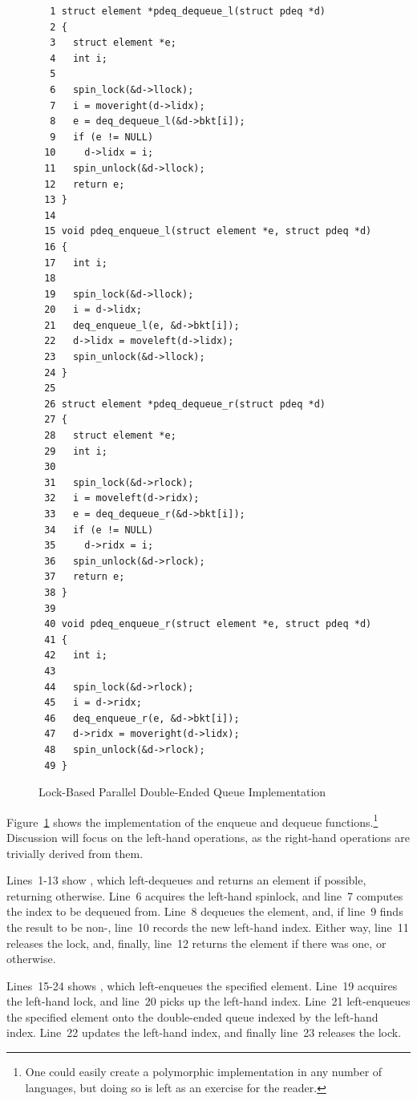 \begin{figure}[bp]
{ \scriptsize
\begin{verbatim}
  1 struct element *pdeq_dequeue_l(struct pdeq *d)
  2 {
  3   struct element *e;
  4   int i;
  5
  6   spin_lock(&d->llock);
  7   i = moveright(d->lidx);
  8   e = deq_dequeue_l(&d->bkt[i]);
  9   if (e != NULL)
 10     d->lidx = i;
 11   spin_unlock(&d->llock);
 12   return e;
 13 }
 14
 15 void pdeq_enqueue_l(struct element *e, struct pdeq *d)
 16 {
 17   int i;
 18
 19   spin_lock(&d->llock);
 20   i = d->lidx;
 21   deq_enqueue_l(e, &d->bkt[i]);
 22   d->lidx = moveleft(d->lidx);
 23   spin_unlock(&d->llock);
 24 }
 25
 26 struct element *pdeq_dequeue_r(struct pdeq *d)
 27 {
 28   struct element *e;
 29   int i;
 30
 31   spin_lock(&d->rlock);
 32   i = moveleft(d->ridx);
 33   e = deq_dequeue_r(&d->bkt[i]);
 34   if (e != NULL)
 35     d->ridx = i;
 36   spin_unlock(&d->rlock);
 37   return e;
 38 }
 39
 40 void pdeq_enqueue_r(struct element *e, struct pdeq *d)
 41 {
 42   int i;
 43
 44   spin_lock(&d->rlock);
 45   i = d->ridx;
 46   deq_enqueue_r(e, &d->bkt[i]);
 47   d->ridx = moveright(d->lidx);
 48   spin_unlock(&d->rlock);
 49 }
\end{verbatim}
}
\caption{Lock-Based Parallel Double-Ended Queue Implementation}
\label{fig:SMPdesign:Lock-Based Parallel Double-Ended Queue Implementation}
\end{figure}

Figure~\ref{fig:SMPdesign:Lock-Based Parallel Double-Ended Queue Implementation}
shows the implementation of the enqueue and dequeue functions.\footnote{
	One could easily create a polymorphic implementation in any
	number of languages, but doing so is left as an exercise for
	the reader.}
Discussion will focus on the left-hand operations, as the right-hand
operations are trivially derived from them.

Lines~1-13 show , which left-dequeues and returns
an element if possible, returning  otherwise.
Line~6 acquires the left-hand spinlock, and line~7 computes the
index to be dequeued from.
Line~8 dequeues the element, and, if line~9 finds the result to be
non-, line~10 records the new left-hand index.
Either way, line~11 releases the lock, and, finally, line~12 returns
the element if there was one, or  otherwise.

Lines~15-24 shows , which left-enqueues the specified
element.
Line~19 acquires the left-hand lock, and line~20 picks up the left-hand
index.
Line~21 left-enqueues the specified element onto the double-ended queue
indexed by the left-hand index.
Line~22 updates the left-hand index, and finally line~23 releases the lock.

